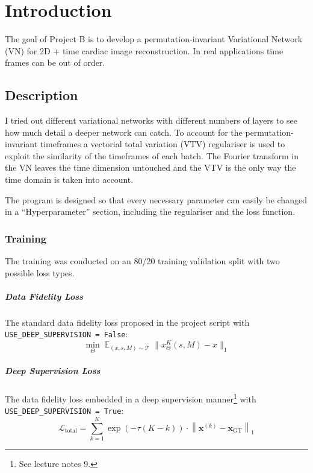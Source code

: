 \newcommand{\package}{\emph}

\chapter{Introduction}

The goal of Project B is to develop a permutation-invariant Variational Network (VN) for 2D + time cardiac image reconstruction. In real applications time frames can be out of order.

\section{Description}

I tried out different variational networks with different numbers of layers to see how much detail a deeper network can catch. To account for the permutation-invariant timeframes a vectorial total variation (VTV) regulariser is used to exploit the similarity of the timeframes of each batch. The Fourier transform in the VN leaves the time dimension untouched and the VTV is the only way the time domain is taken into account.

The program is designed so that every necessary parameter can easily be changed in a ``Hyperparameter'' section, including the regulariser and the loss function.

\subsection{Training}

The training was conducted on an 80/20 training validation split with two possible loss types.

\paragraph{Data Fidelity Loss}

The standard data fidelity loss proposed in the project script with \verb|USE_DEEP_SUPERVISION = False|:
\[
\min_{\Theta} \; \mathbb{E}_{(x,s,M)\sim\mathcal{T}}\;\bigl\lVert x_{\Theta}^{K}(s,M) - x \bigr\rVert_{1}
\]

\paragraph{Deep Supervision Loss}

The data fidelity loss embedded in a deep supervision manner\footnote{See lecture notes 9.} with \verb|USE_DEEP_SUPERVISION = True|:
\[
\mathcal{L}_{\text{total}} = \sum_{k=1}^K \exp(-\tau (K - k)) \cdot \left\| \mathbf{x}^{(k)} - \mathbf{x}_{\text{GT}} \right\|_1
\]

